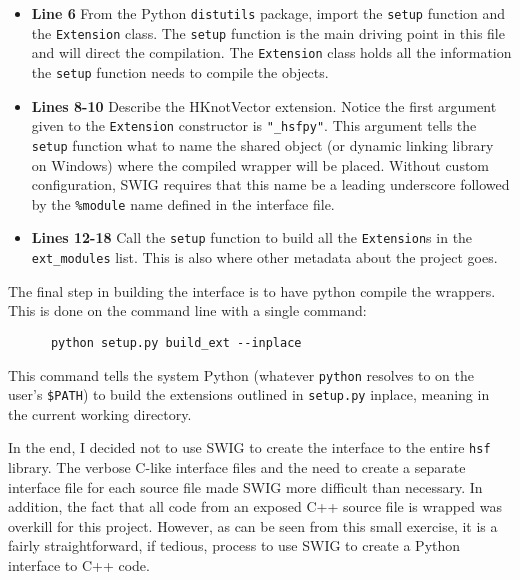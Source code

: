     \begin{itemize}
      \item \textbf{Line 6} From the Python  \texttt{distutils} package, import the \texttt{setup} function and the \texttt{Extension} class. The \texttt{setup} function is the main driving point in this file and will direct the compilation. The \texttt{Extension} class holds all the information the \texttt{setup} function needs to compile the objects.
      \item \textbf{Lines 8-10} Describe the HKnotVector extension. Notice the first argument given to the \texttt{Extension} constructor is \texttt{"\_hsfpy"}. This argument tells the \texttt{setup} function what to name the shared object (or dynamic linking library on Windows) where the compiled wrapper will be placed. Without custom configuration, SWIG requires that this name be a leading underscore followed by the \texttt{\%module} name defined in the interface file.
      \item \textbf{Lines 12-18} Call the \texttt{setup} function to build all the \texttt{Extension}s in the \texttt{ext\_modules} list. This is also where other metadata about the project goes.
    \end{itemize}
    \mainstretch{}

    \noindent The final step in building the interface is to have python compile the wrappers. This is done on the command line with a single command:

    \vspace{.2in}
    \begin{lstlisting}
      python setup.py build_ext --inplace
    \end{lstlisting}
    \mainstretch{}

    \noindent This command tells the system Python (whatever \texttt{python} resolves to on the user's \texttt{\$PATH}) to build the extensions outlined in \texttt{setup.py} inplace, meaning in the current working directory.

    In the end, I decided not to use SWIG to create the interface to the entire \texttt{hsf} library. The verbose C-like interface files and the need to create a separate interface file for each source file made SWIG more difficult than necessary. In addition, the fact that all code from an exposed C++ source file is wrapped was overkill for this project. However, as can be seen from this small exercise, it is a fairly straightforward, if tedious, process to use SWIG to create a Python interface to C++ code.  

